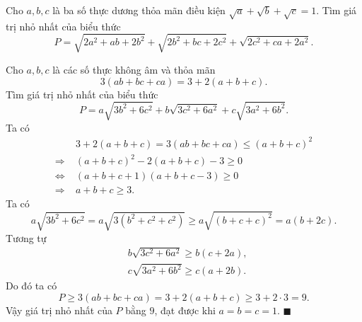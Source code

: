 \begin{bt} %
	Cho $a, b, c$ là ba số thực dương thỏa mãn điều kiện $\sqrt{a}+\sqrt{b}+\sqrt{c}=1$. Tìm giá trị nhỏ nhất của biểu thức $$P=\sqrt{2a^2+ab+2b^2}+\sqrt{2b^2+bc+2c^2}+\sqrt{2c^2+ca+2a^2}.$$
\end{bt}
\begin{bt} %
	Cho $a, b, c$ là các số thực không âm và thỏa mãn $$3(ab+bc+ca)=3+2(a+b+c).$$ Tìm giá trị nhỏ nhất của biểu thức $$P=a\sqrt{3b^2+6c^2}+b\sqrt{3c^2+6a^2}+c\sqrt{3a^2+6b^2}.$$
	\loigiai
	{
		Ta có $$\begin{aligned}
		&3+2(a+b+c)=3(ab+bc+ca)\le (a+b+c)^2\\ 
		\Rightarrow\;&(a+b+c)^2-2(a+b+c)-3\ge 0\\
		\Leftrightarrow\;&(a+b+c+1)(a+b+c-3)\ge 0\\
		\Rightarrow\;&a+b+c\ge 3.
		\end{aligned}$$
		Ta có $$a\sqrt{3b^2+6c^2}=a\sqrt{3(b^2+c^2+c^2)}\ge a\sqrt{(b+c+c)^2}=a(b+2c).$$
		Tương tự $$\begin{aligned}
		&b\sqrt{3c^2+6a^2}\ge b(c+2a),\\ 
		&c\sqrt{3a^2+6b^2}\ge c(a+2b).
		\end{aligned}$$
		Do đó ta có $$P\ge 3(ab+bc+ca)=3+2(a+b+c)\ge 3+2\cdot 3=9.$$
		Vậy giá trị nhỏ nhất của $P$ bằng $9$, đạt được khi $a=b=c=1.$
		$\blacksquare$
	}
\end{bt}

